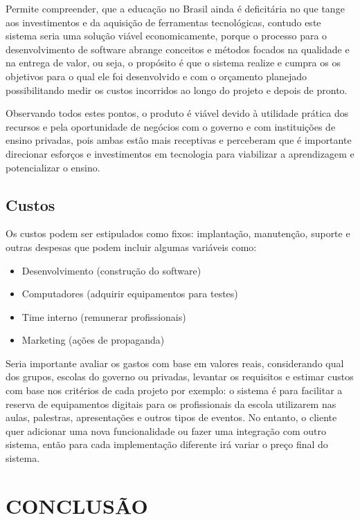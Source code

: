 \documentclass[
12pt,				%
oneside,			%
a4paper,			%
section=TITLE,
brazil,				%
]{abntex2}
\let\oldsection\section
\renewcommand\section{\clearpage\oldsection}
\begin{document}
  Permite compreender, que a educação no Brasil ainda é deficitária no que tange
  aos investimentos e da aquisição de ferramentas tecnológicas, contudo este
  sistema seria uma solução viável economicamente, porque o processo para o
  desenvolvimento de software abrange conceitos e métodos focados na qualidade e
  na entrega de valor, ou seja, o propósito é que o sistema realize e cumpra os
  os objetivos para o qual ele foi desenvolvido e com o orçamento planejado
  possibilitando medir os custos incorridos ao longo do projeto e depois de
  pronto.

  Observando todos estes pontos, o produto é viável devido à utilidade prática
  dos recursos e pela oportunidade de negócios com o governo e com instituições
  de ensino privadas, pois ambas estão mais receptivas e perceberam que é
  importante direcionar esforços e investimentos em tecnologia para viabilizar a
  aprendizagem e potencializar o ensino.


  \subsection{Custos}

  Os custos podem ser estipulados como fixos: implantação, manutenção, suporte e
  outras despesas que podem incluir algumas variáveis como:

  \begin{itemize}
    \item Desenvolvimento (construção do software)
    \item Computadores (adquirir equipamentos para testes)
    \item Time interno (remunerar profissionais)
    \item Marketing (ações de  propaganda)
  \end{itemize}

  Seria importante avaliar os gastos com base em valores reais, considerando qual
  dos grupos, escolas do governo ou privadas, levantar os requisitos e estimar
  custos com base nos critérios de cada projeto por exemplo: o sistema é para
  facilitar a reserva de equipamentos digitais para os profissionais da escola
  utilizarem nas  aulas, palestras, apresentações e outros tipos de eventos. No
  entanto, o cliente quer adicionar uma nova funcionalidade ou fazer uma
  integração com outro sistema, então para cada implementação diferente irá
  variar o preço final do sistema.

  \section{CONCLUSÃO}
\end{document}
